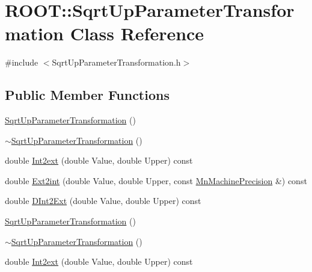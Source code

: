 \hypertarget{classROOT_1_1Minuit2_1_1SqrtUpParameterTransformation}{}\section{R\+O\+OT\+:\+:Sqrt\+Up\+Parameter\+Transformation Class Reference}
\label{classROOT_1_1Minuit2_1_1SqrtUpParameterTransformation}


{\ttfamily \#include $<$Sqrt\+Up\+Parameter\+Transformation.\+h$>$}

\subsection*{Public Member Functions}
\begin{DoxyCompactItemize}
\item 
\mbox{\hyperlink{classROOT_1_1Minuit2_1_1SqrtUpParameterTransformation_a80ef735d8397fb4b24b6c31b422efa29}{Sqrt\+Up\+Parameter\+Transformation}} ()
\item 
\mbox{\hyperlink{classROOT_1_1Minuit2_1_1SqrtUpParameterTransformation_aca319b673b2b9abd5493c318dcb4c6d2}{$\sim$\+Sqrt\+Up\+Parameter\+Transformation}} ()
\item 
double \mbox{\hyperlink{classROOT_1_1Minuit2_1_1SqrtUpParameterTransformation_afd65e37e7e03cb9db5bf9906eb399fc8}{Int2ext}} (double Value, double Upper) const
\item 
double \mbox{\hyperlink{classROOT_1_1Minuit2_1_1SqrtUpParameterTransformation_a8ba129e1707b752df2b477c5e8459958}{Ext2int}} (double Value, double Upper, const \mbox{\hyperlink{classROOT_1_1Minuit2_1_1MnMachinePrecision}{Mn\+Machine\+Precision}} \&) const
\item 
double \mbox{\hyperlink{classROOT_1_1Minuit2_1_1SqrtUpParameterTransformation_a82e3860242c4f0d7a81dabef95803bd1}{D\+Int2\+Ext}} (double Value, double Upper) const
\item 
\mbox{\hyperlink{classROOT_1_1Minuit2_1_1SqrtUpParameterTransformation_a80ef735d8397fb4b24b6c31b422efa29}{Sqrt\+Up\+Parameter\+Transformation}} ()
\item 
\mbox{\hyperlink{classROOT_1_1Minuit2_1_1SqrtUpParameterTransformation_aca319b673b2b9abd5493c318dcb4c6d2}{$\sim$\+Sqrt\+Up\+Parameter\+Transformation}} ()
\item 
double \mbox{\hyperlink{classROOT_1_1Minuit2_1_1SqrtUpParameterTransformation_afd65e37e7e03cb9db5bf9906eb399fc8}{Int2ext}} (double Value, double Upper) const

\end{DoxyCompactItemize}
